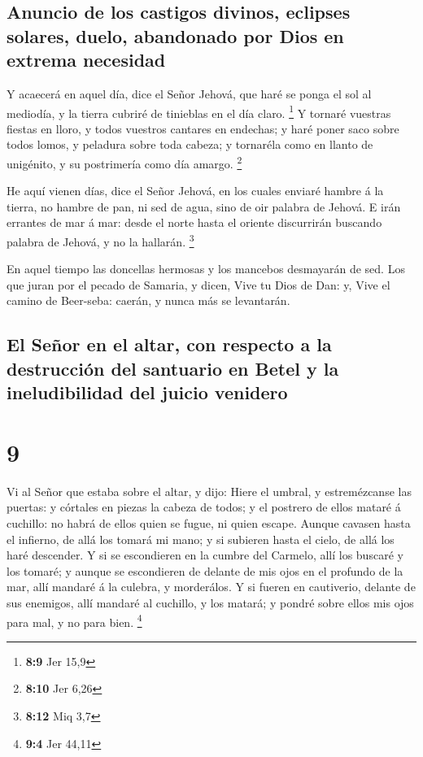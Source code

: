 \hypertarget{anuncio-de-los-castigos-divinos-eclipses-solares-duelo-abandonado-por-dios-en-extrema-necesidad}{%
\subsection{Anuncio de los castigos divinos, eclipses solares, duelo,
abandonado por Dios en extrema
necesidad}\label{anuncio-de-los-castigos-divinos-eclipses-solares-duelo-abandonado-por-dios-en-extrema-necesidad}}

 Y acaecerá en aquel día, dice el Señor Jehová, que haré se
ponga el sol al mediodía, y la tierra cubriré de tinieblas en el día
claro. \footnote{\textbf{8:9} Jer 15,9}  Y tornaré vuestras
fiestas en lloro, y todos vuestros cantares en endechas; y haré poner
saco sobre todos lomos, y peladura sobre toda cabeza; y tornaréla como
en llanto de unigénito, y su postrimería como día amargo. \footnote{\textbf{8:10}
  Jer 6,26}

 He aquí vienen días, dice el Señor Jehová, en los cuales
enviaré hambre á la tierra, no hambre de pan, ni sed de agua, sino de
oir palabra de Jehová.  E irán errantes de mar á mar: desde
el norte hasta el oriente discurrirán buscando palabra de Jehová, y no
la hallarán. \footnote{\textbf{8:12} Miq 3,7}

 En aquel tiempo las doncellas hermosas y los mancebos
desmayarán de sed.  Los que juran por el pecado de Samaria,
y dicen, Vive tu Dios de Dan: y, Vive el camino de Beer-seba: caerán, y
nunca más se levantarán.

\hypertarget{el-seuxf1or-en-el-altar-con-respecto-a-la-destrucciuxf3n-del-santuario-en-betel-y-la-ineludibilidad-del-juicio-venidero}{%
\subsection{El Señor en el altar, con respecto a la destrucción del
santuario en Betel y la ineludibilidad del juicio
venidero}\label{el-seuxf1or-en-el-altar-con-respecto-a-la-destrucciuxf3n-del-santuario-en-betel-y-la-ineludibilidad-del-juicio-venidero}}

\hypertarget{section-8}{%
\section{9}\label{section-8}}

 Vi al Señor que estaba sobre el altar, y dijo: Hiere el
umbral, y estremézcanse las puertas: y córtales en piezas la cabeza de
todos; y el postrero de ellos mataré á cuchillo: no habrá de ellos quien
se fugue, ni quien escape.  Aunque cavasen hasta el
infierno, de allá los tomará mi mano; y si subieren hasta el cielo, de
allá los haré descender.  Y si se escondieren en la cumbre
del Carmelo, allí los buscaré y los tomaré; y aunque se escondieren de
delante de mis ojos en el profundo de la mar, allí mandaré á la culebra,
y morderálos.  Y si fueren en cautiverio, delante de sus
enemigos, allí mandaré al cuchillo, y los matará; y pondré sobre ellos
mis ojos para mal, y no para bien. \footnote{\textbf{9:4} Jer 44,11}

